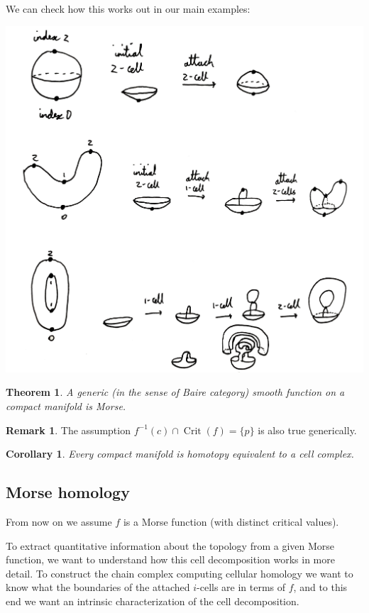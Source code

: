 \documentclass{article}
\newtheorem*{theorem}{Theorem}
\newtheorem*{corollary}{Corollary}
\theoremstyle{definition}
\newtheorem*{remark}{Remark}
\DeclareMathOperator{\Crit}{Crit}
\begin{document}
We can check how this works out in our main examples:

\begin{center}
    \includegraphics[scale=0.14]{morse_cells}
\end{center}

\begin{theorem}
    A generic (in the sense of Baire category) smooth function on a compact
    manifold is Morse.
\end{theorem}

\begin{remark}
    The assumption $f^{-1}(c)\cap\Crit(f)=\{p\}$ is also true generically.
\end{remark}

\begin{corollary}
    Every compact manifold is homotopy equivalent to a cell complex.
\end{corollary}

\subsection*{Morse homology}

From now on we assume $f$ is a Morse function (with distinct critical values).

To extract quantitative information about the topology from a given Morse
function, we want to understand how this cell decomposition works in more
detail. To construct the chain complex computing cellular homology we want to
know what the boundaries of the attached $i$-cells are in terms of $f$, and to
this end we want an intrinsic characterization of the cell decomposition.
\end{document}
